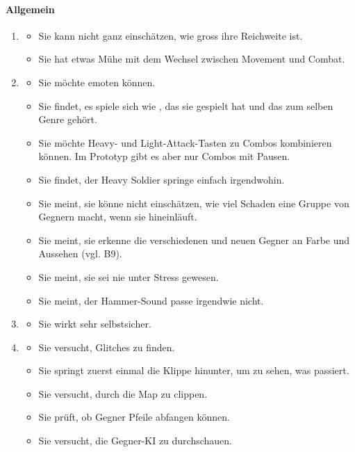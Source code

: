 \documentclass[../Main.tex]{subfiles}
\begin{document}
\paragraph{Allgemein}
\begin{enumerate}[label=\textbf{B\arabic*}, leftmargin=1.5cm, itemsep=0.8em, resume]
\item
\begin{itemize}[nosep]
\item Sie kann nicht ganz einschätzen, wie gross ihre Reichweite ist.
\item Sie hat etwas Mühe mit dem Wechsel zwischen Movement und Combat.
\end{itemize}
\item
\begin{itemize}[nosep]
\item Sie möchte emoten können.
\item Sie findet, es spiele sich wie , das sie gespielt hat und das zum selben Genre gehört.
\item Sie möchte Heavy- und Light-Attack-Tasten zu Combos kombinieren können. Im Prototyp gibt es aber nur Combos mit Pausen.
\item Sie findet, der Heavy Soldier springe einfach irgendwohin.
\item Sie meint, sie könne nicht einschätzen, wie viel Schaden eine Gruppe von Gegnern macht, wenn sie hineinläuft.
\item Sie meint, sie erkenne die verschiedenen und neuen Gegner an Farbe und Aussehen (vgl. B9).
\item Sie meint, sie sei nie unter Stress gewesen.
\item Sie meint, der Hammer-Sound passe irgendwie nicht.
\end{itemize}
\item
\begin{itemize}[nosep]
\item Sie wirkt sehr selbstsicher.
\end{itemize}
\item
\begin{itemize}[nosep]
\item Sie versucht, Glitches zu finden.
\item Sie springt zuerst einmal die Klippe hinunter, um zu sehen, was passiert.
\item Sie versucht, durch die Map zu clippen.
\item Sie prüft, ob Gegner Pfeile abfangen können.
\item Sie versucht, die Gegner-KI zu durchschauen.

\end{itemize}
\end{enumerate}
\end{document}
